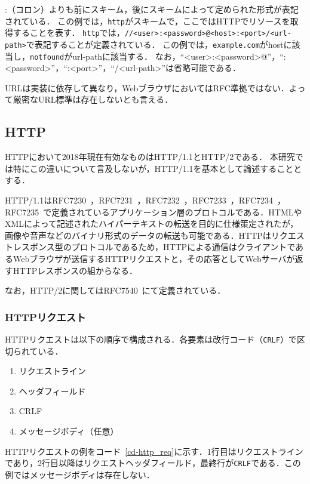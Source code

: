 :（コロン）よりも前にスキーム，後にスキームによって定められた形式が表記されている．
この例では，\texttt{http}がスキームで，ここではHTTPでリソースを取得することを表す．
\texttt{http}では，\texttt{//<user>:<password>@<host>:<port>/<url-path>}で表記することが定義されている．
この例では，\texttt{example.com}がhostに該当し，\texttt{notfound}がurl-pathに該当する．
なお，``<user>:<password>@''，``:<password>''，``:<port>''，``/<url-path>''は省略可能である．

URLは実装に依存して異なり，WebブラウザにおいてはRFC準拠ではない．よって厳密なURL標準は存在しないとも言える．

\subsection{HTTP}
HTTPにおいて2018年現在有効なものはHTTP/1.1とHTTP/2である．
本研究では特にこの違いについて言及しないが，HTTP/1.1を基本として論述することとする．

HTTP/1.1はRFC7230~\cite{rfc7230}，RFC7231~\cite{rfc7231}，RFC7232~\cite{rfc7232}，RFC7233~\cite{rfc7233}，RFC7234~\cite{rfc7234}，RFC7235~\cite{rfc7235}で定義されているアプリケーション層のプロトコルである．HTMLやXMLによって記述されたハイパーテキストの転送を目的に仕様策定されたが，画像や音声などのバイナリ形式のデータの転送も可能である．HTTPはリクエストレスポンス型のプロトコルであるため，HTTPによる通信はクライアントであるWebブラウザが送信するHTTPリクエストと，その応答としてWebサーバが返すHTTPレスポンスの組からなる．

なお，HTTP/2に関してはRFC7540~\cite{rfc7540}にて定義されている．
\subsubsection{HTTPリクエスト}
HTTPリクエストは以下の順序で構成される．各要素は改行コード（\texttt{CRLF}）で区切られている．
\begin{enumerate}
\item リクエストライン
\item ヘッダフィールド
\item CRLF
\item メッセージボディ（任意）
\end{enumerate}
HTTPリクエストの例をコード~\ref{cd-http_req}に示す．1行目はリクエストラインであり，2行目以降はリクエストヘッダフィールド，最終行が\texttt{CRLF}である．この例ではメッセージボディは存在しない．

